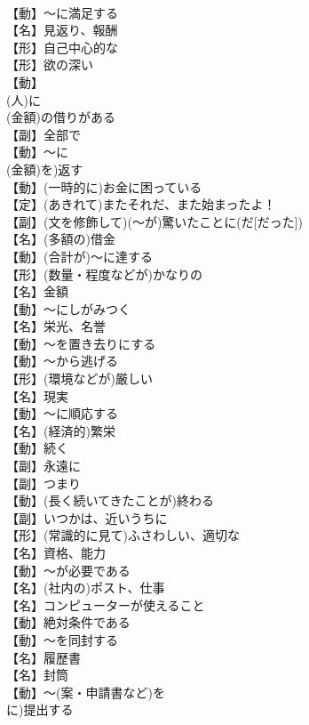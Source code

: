 \documentclass[8pt]{extreport}
\begin{document}
\begin{CJK}{UTF8}{min}
\\	【動】～に満足する
\\	【名】見返り、報酬
\\	【形】自己中心的な
\\	【形】欲の深い
\\	【動】
\\	(人)に
\\	(金額)の借りがある
\\	【副】全部で
\\	【動】～に
\\	(金額)を)返す
\\	【動】(一時的に)お金に困っている
\\	【定】(あきれて)またそれだ、また始まったよ！
\\	【副】(文を修飾して)(～が)驚いたことに(だ[だった])
\\	【名】(多額の)借金
\\	【動】(合計が)～に達する
\\	【形】(数量・程度などが)かなりの
\\	【名】金額
\\	【動】～にしがみつく
\\	【名】栄光、名誉
\\	【動】～を置き去りにする
\\	【動】～から逃げる
\\	【形】(環境などが)厳しい
\\	【名】現実
\\	【動】～に順応する
\\	【名】(経済的)繁栄
\\	【動】続く
\\	【副】永遠に
\\	【副】つまり
\\	【動】(長く続いてきたことが)終わる
\\	【副】いつかは、近いうちに
\\	【形】(常識的に見て)ふさわしい、適切な
\\	【名】資格、能力
\\	【動】～が必要である
\\	【名】(社内の)ポスト、仕事
\\	【名】コンピューターが使えること
\\	【動】絶対条件である
\\	【動】～を同封する
\\	【名】履歴書
\\	【名】封筒
\\	【動】～(案・申請書など)を
\\	に)提出する

\end{CJK}
\end{document}
